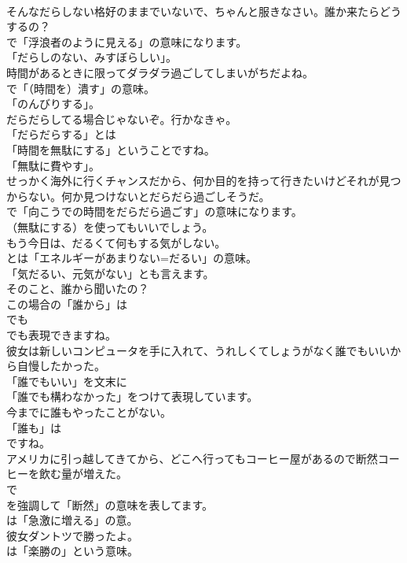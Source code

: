 \documentclass[8pt]{extreport}
\begin{document}
\begin{CJK}{UTF8}{min}
\\	そんなだらしない格好のままでいないで、ちゃんと服きなさい。誰か来たらどうするの？ 
\\	で「浮浪者のように見える」の意味になります。
\\	「だらしのない、みすぼらしい」。	
\\	時間があるときに限ってダラダラ過ごしてしまいがちだよね。 
\\	で「（時間を）潰す」の意味。
\\	「のんびりする」。	
\\	だらだらしてる場合じゃないぞ。行かなきゃ。 
\\	「だらだらする」とは
\\	「時間を無駄にする」ということですね。
\\	「無駄に費やす」。	
\\	せっかく海外に行くチャンスだから、何か目的を持って行きたいけどそれが見つからない。何か見つけないとだらだら過ごしそうだ。 
\\	で「向こうでの時間をだらだら過ごす」の意味になります。
\\	（無駄にする）を使ってもいいでしょう。	
\\	もう今日は、だるくて何もする気がしない。 
\\	とは「エネルギーがあまりない=だるい」の意味。
\\	「気だるい、元気がない」とも言えます。	
\\	そのこと、誰から聞いたの？ 
\\	この場合の「誰から」は
\\	でも
\\	でも表現できますね。	
\\	彼女は新しいコンピュータを手に入れて、うれしくてしょうがなく誰でもいいから自慢したかった。 
\\	「誰でもいい」を文末に
\\	「誰でも構わなかった」をつけて表現しています。	
\\	今までに誰もやったことがない。 
\\	「誰も」は
\\	ですね。	
\\	アメリカに引っ越してきてから、どこへ行ってもコーヒー屋があるので断然コーヒーを飲む量が増えた。 
\\	で 
\\	を強調して「断然」の意味を表してます。
\\	は「急激に増える」の意。	
\\	彼女ダントツで勝ったよ。 
\\	は「楽勝の」という意味。

\end{CJK}
\end{document}
